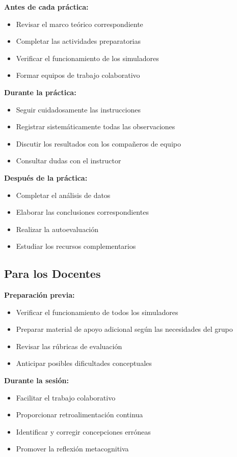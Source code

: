 \documentclass[12pt,a4paper]{book}
\begin{document}
	\begin{notabox}
		\textbf{Antes de cada práctica:}
		\begin{itemize}
			\item Revisar el marco teórico correspondiente
			\item Completar las actividades preparatorias
			\item Verificar el funcionamiento de los simuladores
			\item Formar equipos de trabajo colaborativo
		\end{itemize}
		
		\textbf{Durante la práctica:}
		\begin{itemize}
			\item Seguir cuidadosamente las instrucciones
			\item Registrar sistemáticamente todas las observaciones
			\item Discutir los resultados con los compañeros de equipo
			\item Consultar dudas con el instructor
		\end{itemize}
		
		\textbf{Después de la práctica:}
		\begin{itemize}
			\item Completar el análisis de datos
			\item Elaborar las conclusiones correspondientes
			\item Realizar la autoevaluación
			\item Estudiar los recursos complementarios
		\end{itemize}
	\end{notabox}
	
	\subsection{Para los Docentes}
	
	\textbf{Preparación previa:}
	\begin{itemize}
		\item Verificar el funcionamiento de todos los simuladores
		\item Preparar material de apoyo adicional según las necesidades del grupo
		\item Revisar las rúbricas de evaluación
		\item Anticipar posibles dificultades conceptuales
	\end{itemize}
	
	\textbf{Durante la sesión:}
	\begin{itemize}
		\item Facilitar el trabajo colaborativo
		\item Proporcionar retroalimentación continua
		\item Identificar y corregir concepciones erróneas
		\item Promover la reflexión metacognitiva
	\end{itemize}
	
\end{document}
